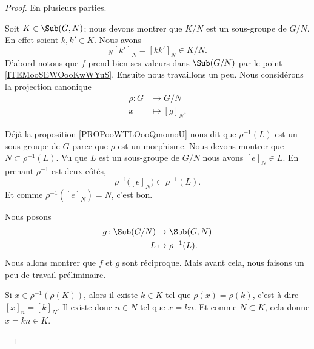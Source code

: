 \begin{proof}
	En plusieurs parties.
	\begin{subproof}
		Soit \( K\in \Sub(G,N)\); nous devons montrer que \( K/N\) est un sous-groupe de \( G/N\). En effet soient \( k,k'\in K\). Nous avons
		\begin{equation}
			[k]_N[k']_N=[kk']_N\in K/N.
		\end{equation}
		D'abord notons que \( f\) prend bien ses valeurs dans \( \Sub(G/N)\) par le point \ref{ITEMooSEWOooKwWYuS}. Ensuite nous travaillons un peu. Nous considérons la projection canonique
		\begin{equation}
			\begin{aligned}
				\rho\colon G & \to G/N        \\
				x            & \mapsto [g]_N.
			\end{aligned}
		\end{equation}
		\begin{subproof}
			Déjà la proposition \ref{PROPooWTLOooQmomoU} nous dit que \( \rho^{-1}(L)\) est un sous-groupe de \( G\) parce que \( \rho\) est un morphisme. Nous devons montrer que \( N\subset\rho^{-1}(L)\). Vu que \( L\) est un sous-groupe de \( G/N\) nous avons \( [e]_N\in L\). En prenant \( \rho^{-1}\) est deux côtés,
			\begin{equation}
				\rho^{-1}\big( [e]_N \big)\subset \rho^{-1}(L).
			\end{equation}
			Et comme \( \rho^{-1}([e]_N)=N\), c'est bon.

			\spitem[L'application \( g\)]
			Nous posons
			\begin{equation}
				\begin{aligned}
					g\colon \Sub(G/N) & \to \Sub(G,N)         \\
					L                 & \mapsto \rho^{-1}(L).
				\end{aligned}
			\end{equation}
			Nous allons montrer que \( f\) et \( g\) sont réciproque. Mais avant cela, nous faisons un peu de travail préliminaire.

			\spitem[Si \( K\in \Sub(G,N)\) alors \( \rho^{-1}\big( \rho(K) \big)=K\)]		\label{SUBITEMooIUBJooTPpKAE}
			Si \( x\in \rho^{-1}(\rho(K))\), alors il existe \( k\in K\) tel que \( \rho(x)=\rho(k)\), c'est-à-dire \( [x]_n=[k]_N\). Il existe donc \( n\in N\) tel que \( x=kn\). Et comme \( N\subset K\), cela donne \( x=kn\in K\).


\end{subproof}
\end{subproof}
\end{proof}
